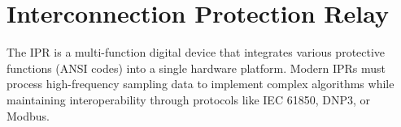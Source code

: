 









\section{Interconnection Protection Relay}
The IPR is a multi-function digital device that integrates various protective functions (ANSI codes) into a single hardware platform. Modern IPRs must process high-frequency sampling data to implement complex algorithms while maintaining interoperability through protocols like IEC 61850, DNP3, or Modbus.




